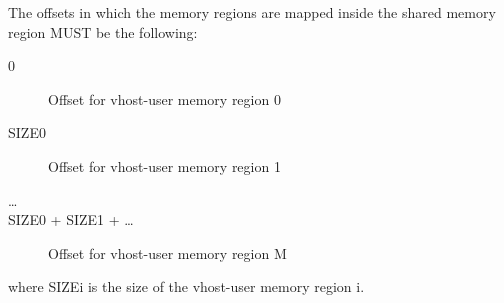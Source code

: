 The offsets in which the memory regions are mapped inside the shared memory
region MUST be the following:

\begin{description}
\item[0] Offset for vhost-user memory region 0
\item[SIZE0] Offset for vhost-user memory region 1
\item[\ldots]
\item[SIZE0 + SIZE1 + \ldots] Offset for vhost-user memory region M
\end{description}

where SIZEi is the size of the vhost-user memory region i.
